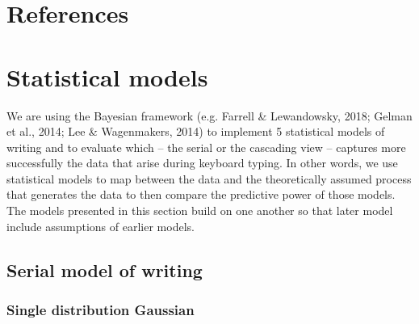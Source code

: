 \documentclass[
  man,floatsintext]{apa7}
\begin{document}
\newpage

\hypertarget{references}{%
\section{References}\label{references}}

\begingroup

\setlength{\parindent}{-0.5in}

\setlength{\leftskip}{0.5in}

\hypertarget{references}{}

\endgroup

\newpage

\hypertarget{appendix-appendix}{%
\appendix}


\newpage

\hypertarget{statistical-models}{%
\section{Statistical models}\label{statistical-models}}

We are using the Bayesian framework (e.g. Farrell \& Lewandowsky, 2018; Gelman et al., 2014; Lee \& Wagenmakers, 2014) to implement 5 statistical models of writing and to evaluate which -- the serial or the cascading view -- captures more successfully the data that arise during keyboard typing. In other words, we use statistical models to map between the data and the theoretically assumed process that generates the data to then compare the predictive power of those models. The models presented in this section build on one another so that later model include assumptions of earlier models.

\hypertarget{serial-model-of-writing}{%
\subsection{Serial model of writing}\label{serial-model-of-writing}}

\hypertarget{single-distribution-gaussian}{%
\subsubsection{Single distribution Gaussian}\label{single-distribution-gaussian}}
\end{document}
